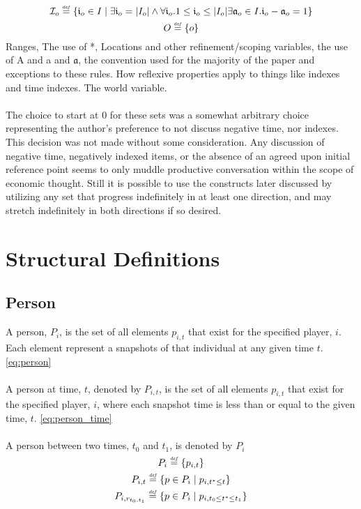 \documentclass[]{article}
\newcommand{\defeq}{\stackrel{\smash{\scriptscriptstyle\mathit{def}}}{=}}
\begin{document}
\begin{equation} \label{eq:relative_object_index}
\mathcal{I}_{o} \defeq \{ \mathfrak{i}_{o} \in I \mid \exists \mathfrak{i}_{o} = |I_{o}| \wedge \forall \mathfrak{i}_{o}.1 \leq \mathfrak{i}_{o} \leq |I_{o}|  \exists \mathfrak{a}_{o} \in I.\mathfrak{i}_{o}-\mathfrak{a}_{o}=1 \} 
\end{equation}
\begin{equation} \label{eq:o}
O \defeq \{ o \}
\end{equation}
%
Ranges, The use of *, Locations and other refinement/scoping variables, the use of A and a and $\mathfrak{a}$, the convention used for the majority of the paper and exceptions to these rules. How reflexive properties apply to things like indexes and time indexes. The world variable. 
\\
\\
The choice to start at $0$ for these sets was a somewhat arbitrary choice representing the author's preference to not discuss negative time, nor indexes. This decision was not made without some consideration. Any discussion of negative time, negatively indexed items, or the absence of an agreed upon initial reference point seems to only muddle productive conversation within the scope of economic thought. Still it is possible to use the constructs later discussed by utilizing any set that progress indefinitely in at least one direction, and may stretch indefinitely in both directions if so desired. 
%
\section*{Structural Definitions}
\subsection*{Person}
A person, $P_{i}$, is the set of all elements $p_{i,t}$ that exist for the specified player, $i$. Each element represent a snapshots of that individual at any given time $t$. \eqref{eq:person}
\\
\\
A person at time, $t$, denoted by $P_{i,t}$, is the set of all elements $p_{i,t}$ that exist for the specified player, $i$, where each snapshot time is less than or equal to the given time, $t$. \eqref{eq:person_time}
\\
\\
A person between two times, $t_{0}$ and $t_{1}$, is denoted by $P_{i}$
%
\begin{equation} \label{eq:person} 
P_{i} \defeq \{ p_{i,t} \} 
\end{equation}
\begin{equation} \label{eq:person_time} 
P_{i,t} \defeq \{ p \in P_{i} \mid p_{i,t^{*} \leq t} \} 
\end{equation}
\begin{equation} \label{eq:person_time_range} 
P_{i,r_{t_{0},t_{1}}} \defeq \{ p \in P_{i} \mid p_{i,t_{0} \leq t^{*} \leq t_{1}} \} 
\end{equation}    
%
\end{document}
